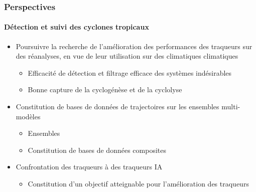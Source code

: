 \documentclass[aspectratio=169, usepdftitle=false, xcolor={dvipsnames}, 9pt,table]{beamer}
\begin{document}
\begin{frame}[c]
    \frametitle{Perspectives}
    \framesubtitle{Détection et suivi des cyclones tropicaux}
    \begin{block}
        \small
        \begin{itemize}
            \setlength{\itemsep}{2ex}
            \item<1-> Poursuivre la recherche de l'amélioration des performances des traqueurs sur des réanalyses, en vue de leur utilisation sur des climatiques
                climatiques
                \begin{itemize}
                    \item Efficacité de détection et filtrage efficace des systèmes indésirables
                    \item Bonne capture de la cyclogénèse et de la cyclolyse
                \end{itemize}
            \item<2-> Constitution de bases de données  de trajectoires sur les ensembles multi-modèles 
                \begin{itemize}
                    \item Ensembles 
                    \item Constitution de bases de données composites
                \end{itemize}
            \item<3-> Confrontation des traqueurs  à des traqueurs IA
                \begin{itemize}
                    \item Constitution d'un objectif atteignable pour l'amélioration des traqueurs
                \end{itemize}
        \end{itemize}
    \end{block}
\end{frame}
\end{document}
